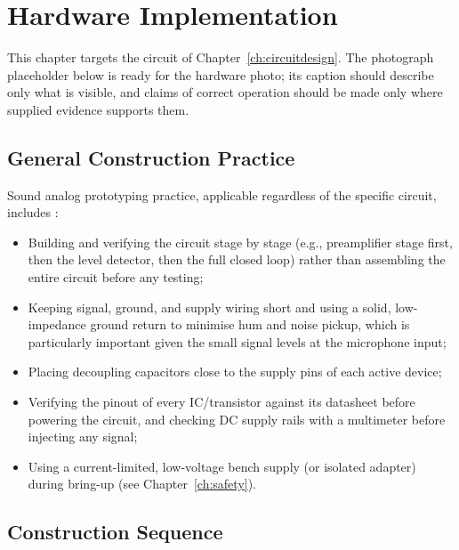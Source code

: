 \chapter{Hardware Implementation}
\label{ch:hardware}

This chapter targets the circuit of Chapter~\ref{ch:circuitdesign}. The photograph placeholder below is ready for the hardware photo; its caption should describe only what is visible, and claims of correct operation should be made only where supplied evidence supports them.

\section{General Construction Practice}

Sound analog prototyping practice, applicable regardless of the specific circuit, includes \cite{ref1,ref4}:
\begin{itemize}
    \item Building and verifying the circuit stage by stage (e.g., preamplifier stage first, then the level detector, then the full closed loop) rather than assembling the entire circuit before any testing;
    \item Keeping signal, ground, and supply wiring short and using a solid, low-impedance ground return to minimise hum and noise pickup, which is particularly important given the small signal levels at the microphone input;
    \item Placing decoupling capacitors close to the supply pins of each active device;
    \item Verifying the pinout of every IC/transistor against its datasheet before powering the circuit, and checking DC supply rails with a multimeter before injecting any signal;
    \item Using a current-limited, low-voltage bench supply (or isolated adapter) during bring-up (see Chapter~\ref{ch:safety}).
\end{itemize}

\section{Construction Sequence}

